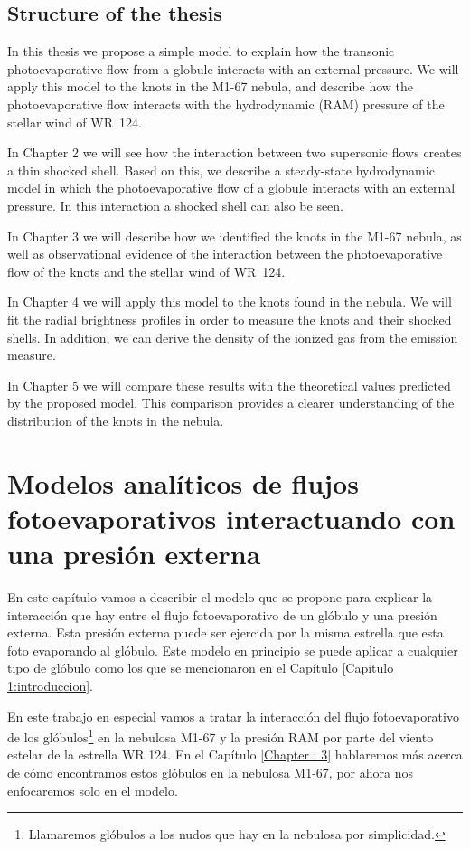 \documentclass{book}
\begin{document}
\section{Structure of the thesis}

In this thesis we propose a simple model to explain how the transonic
photoevaporative flow from a globule interacts with an external
pressure. We will apply this model to the knots in the M1-67 nebula,
and describe how the photoevaporative flow interacts with the
hydrodynamic (RAM) pressure of the stellar wind of WR~124.

In Chapter 2 we will see how the interaction between two supersonic
flows creates a thin shocked shell. Based on this, we describe a
steady-state hydrodynamic model in which the photoevaporative flow of
a globule interacts with an external pressure. In this interaction a
shocked shell can also be seen.

In Chapter 3 we will describe how we identified the knots in the M1-67
nebula, as well as observational evidence of the interaction between
the photoevaporative flow of the knots and the stellar wind of WR~124.

In Chapter 4 we will apply this model to the knots found in the
nebula. We will fit the radial brightness profiles in order to measure
the knots and their shocked shells. In addition, we can derive the
density of the ionized gas from the emission measure.

In Chapter 5 we will compare these results with the theoretical values
predicted by the proposed model. This comparison provides a clearer
understanding of the distribution of the knots in the nebula.

\chapter{Modelos analíticos de flujos fotoevaporativos interactuando
  con una presión externa}
\label{Chapter : Modelo}

En este capítulo vamos a describir el modelo que se propone para
explicar la interacción que hay entre el flujo fotoevaporativo de un
glóbulo y una presión externa. Esta presión externa puede ser ejercida
por la misma estrella que esta foto evaporando al glóbulo. Este modelo
en principio se puede aplicar a cualquier tipo de glóbulo como los que
se mencionaron en el Capítulo \ref{Capitulo 1:introduccion}.

En este trabajo en especial vamos a tratar la interacción del flujo
fotoevaporativo de los glóbulos\footnote{Llamaremos glóbulos a los
nudos que hay en la nebulosa por simplicidad.} en la nebulosa M1-67 y
la presión RAM por parte del viento estelar de la estrella WR 124. En
el Capítulo \ref{Chapter : 3} hablaremos más acerca de cómo
encontramos estos glóbulos en la nebulosa M1-67, por ahora nos
enfocaremos solo en el modelo.
\end{document}
